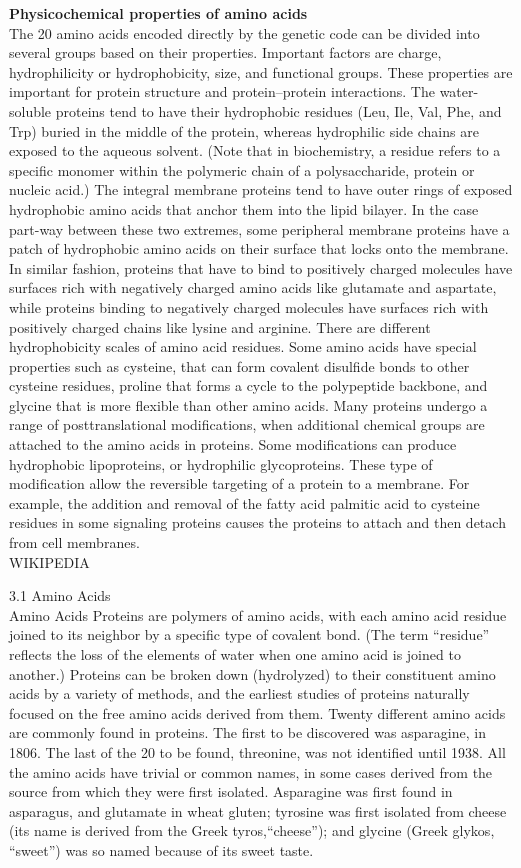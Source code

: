 \textbf{Physicochemical properties of amino acids}\\
The 20 amino acids encoded directly by the genetic code can be divided into several groups based on their properties. Important factors are charge, hydrophilicity or hydrophobicity, size, and functional groups. These properties are important for protein structure and protein–protein interactions. The water-soluble proteins tend to have their hydrophobic residues (Leu, Ile, Val, Phe, and Trp) buried in the middle of the protein, whereas hydrophilic side chains are exposed to the aqueous solvent. (Note that in biochemistry, a residue refers to a specific monomer within the polymeric chain of a polysaccharide, protein or nucleic acid.) The integral membrane proteins tend to have outer rings of exposed hydrophobic amino acids that anchor them into the lipid bilayer. In the case part-way between these two extremes, some peripheral membrane proteins have a patch of hydrophobic amino acids on their surface that locks onto the membrane. In similar fashion, proteins that have to bind to positively charged molecules have surfaces rich with negatively charged amino acids like glutamate and aspartate, while proteins binding to negatively charged molecules have surfaces rich with positively charged chains like lysine and arginine. There are different hydrophobicity scales of amino acid residues.
Some amino acids have special properties such as cysteine, that can form covalent disulfide bonds to other cysteine residues, proline that forms a cycle to the polypeptide backbone, and glycine that is more flexible than other amino acids. 
Many proteins undergo a range of posttranslational modifications, when additional chemical groups are attached to the amino acids in proteins. Some modifications can produce hydrophobic lipoproteins, or hydrophilic glycoproteins. These type of modification allow the reversible targeting of a protein to a membrane. For example, the addition and removal of the fatty acid palmitic acid to cysteine residues in some signaling proteins causes the proteins to attach and then detach from cell membranes.
\\
WIKIPEDIA

3.1 Amino Acids\\
Amino Acids Proteins are polymers of amino acids, with each amino acid residue joined to its neighbor by a specific type of covalent bond. (The term ``residue'' reflects the loss of the elements of water when one amino acid is joined to another.) Proteins can be broken down (hydrolyzed) to their constituent amino acids by a variety of methods, and the earliest studies of proteins naturally focused on the free amino acids derived from them. Twenty different amino acids are commonly found in proteins. The first to be discovered was asparagine, in 1806. The last of the 20 to be found, threonine, was not identified until 1938. All the amino acids have trivial or common names, in some cases derived from the source from which they were first isolated. Asparagine was first found in asparagus, and glutamate in wheat gluten; tyrosine was first isolated from cheese (its name is derived from the Greek tyros,``cheese''); and glycine (Greek glykos, ``sweet'') was so named because of its sweet taste.

